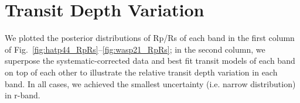\section{Transit Depth Variation}\label{sec:spectrum}
We plotted the posterior distributions of Rp/Rs of each band in the first column of Fig.~\ref{fig:hatp44_RpRs}--\ref{fig:wasp21_RpRs}; in the second column, we superpose the systematic-corrected data and best fit transit models of each band on top of each other to illustrate the relative transit depth variation in each band. In all cases, we achieved the smallest uncertainty (i.e. narrow distribution) in r-band.%


